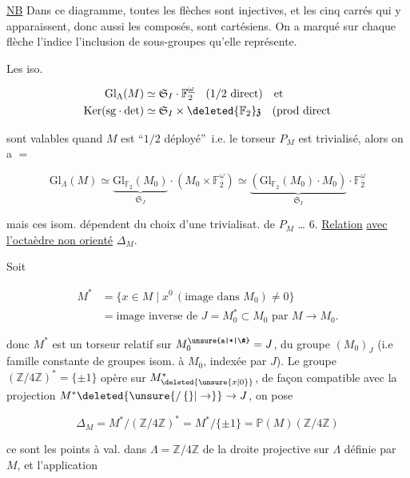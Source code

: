 \uline{NB} Dans ce diagramme, toutes les flèches sont injectives, et les cinq carrés qui y apparaissent, donc aussi les composés, sont cartésiens. On a marqué sur chaque flèche l'indice   l'inclusion de sous-groupes qu'elle représente.

Les iso.

\[
\begin{aligned}
\mathrm{Gl}_{\Lambda}(M)&\simeq\mathfrak S_I\cdot\mathbb F_2^{\underline\omega}\quad(1/2\text{ direct})\quad\text{et}\\
\mathrm{Ker}(\mathrm{sg}\cdot\det)&\simeq\mathfrak S_I\times\deleted{\mathbb F_2}\mathfrak z\quad(\text{prod direct}
\end{aligned}
\]

sont valables quand $M$ est \textquotedblleft $1/2$ déployé\textquotedblright\ i.e. le torseur $P_M$ est trivialisé, alors on a $=$

\[
\mathrm{Gl}_{\Lambda}(M)\simeq
\underbrace{\mathrm{Gl}_{\mathbb F_2}(M_0)}_{\mathfrak S_J}\cdot(M_0\times\mathbb F_2^{\underline\omega})
\simeq\underbrace{(\mathrm{Gl}_{\mathbb F_2}(M_0)\cdot M_0)}_{\mathfrak S_I}\cdot\mathbb F_2^{\underline\omega}
\]

mais ces isom. dépendent du choix d'une trivialisat. de $P_M$ \ldots
6. \uline{Relation} \uline{avec l'octaèdre non orienté} $\Delta_M$.

Soit

\[
\begin{aligned}
M^*&=\{x\in M\mid x^0\,(\text{image dans }M_0)\ne0\}\\
&=\text{image inverse de }J=M_0^*\subset M_0\text{ par } M\longrightarrow M_0 .
\end{aligned}\tag*{(29)}
\]

 donc $M^*$ est un torseur relatif sur $M_0^{\unsure{a|*|\#}}=J$, du groupe $(M_0)_J$ (i.e famille constante de groupes isom. à $M_0$, indexée par $J$). Le groupe $(\mathbb Z/4\mathbb Z)^*=\{\pm1\}$ opère sur $M^{*}_{\deleted{\unsure{x|0}}}$, de façon compatible avec la projection $M^*\deleted{\unsure{/\,\{\}|\to}}\to J$, on pose

\[
\Delta_M=M^*/(\mathbb Z/4\mathbb Z)^*=M^*/\{\pm1\}=\mathbb P(M)(\mathbb Z/4\mathbb Z)\tag*{(30)}
\]

ce sont les points  à val. dans $\Lambda=\mathbb Z/4\mathbb Z$ de la droite projective sur $\Lambda$ définie par $M$, et l'application  

